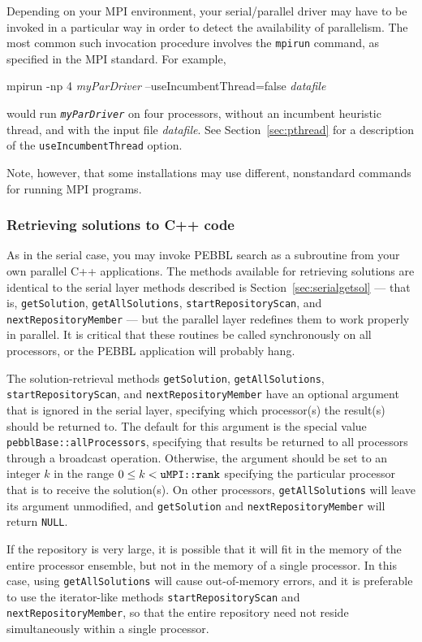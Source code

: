 Depending on your MPI environment, your serial/parallel driver may
have to be invoked in a particular way in order to detect the
availability of parallelism.  The most common such invocation
procedure involves the \texttt{mpirun} command, as specified in the
MPI standard.  For example,
\begin{codeblock}
mpirun -np 4 \emph{myParDriver} --useIncumbentThread=false 
\textrm{\emph{datafile}}
\end{codeblock}
would run \texttt{\emph{myParDriver}} on four processors, without an
incumbent heuristic thread, and with the input file \emph{datafile}.
See Section~\ref{sec:pthread} for a description of the
\texttt{useIncumbentThread} option.

Note, however, that some installations may use different, nonstandard
commands for running MPI programs.

\subsubsection{Retrieving solutions to C++ code}
\label{sec:pargetsol}
As in the serial case, you may invoke PEBBL search as a subroutine
from your own parallel C++ applications.  The methods available for
retrieving solutions are identical to the serial layer methods described is
Section~\ref{sec:serialgetsol} --- that is, \texttt{getSolution},
\texttt{getAllSolutions}, \texttt{startRepositoryScan}, and
\texttt{nextRepositoryMember} --- but the parallel layer redefines
them to work properly in parallel.  It is critical that these routines
be called synchronously on all processors, or the PEBBL application
will probably hang.

The solution-retrieval methods \texttt{getSolution},
\texttt{getAllSolutions}, \texttt{startRepositoryScan}, and
\texttt{nextRepositoryMember} have an optional argument that is
ignored in the serial layer, specifying which processor(s) the result(s)
should be returned to.  The default for this argument is the special value 
\texttt{pebblBase::allProcessors}, specifying that results be returned
to all processors through a broadcast operation.  Otherwise, the
argument should be set to an integer $k$ in the range $0 \leq k <
\text{\texttt{uMPI::rank}}$ specifying the particular processor that
is to receive the solution(s).  On other processors,
\texttt{getAllSolutions} will leave its argument unmodified, and
\texttt{getSolution} and \texttt{nextRepositoryMember} will return
\texttt{NULL}.

If the repository is very large, it is possible that it will fit
in the memory of the entire processor ensemble, but not in the memory
of a single processor.  In this case, using \texttt{getAllSolutions}
will cause out-of-memory errors, and it is preferable to use the
iterator-like methods \texttt{startRepositoryScan} and
\texttt{nextRepositoryMember}, so that the entire repository need not
reside simultaneously within a single processor.  

